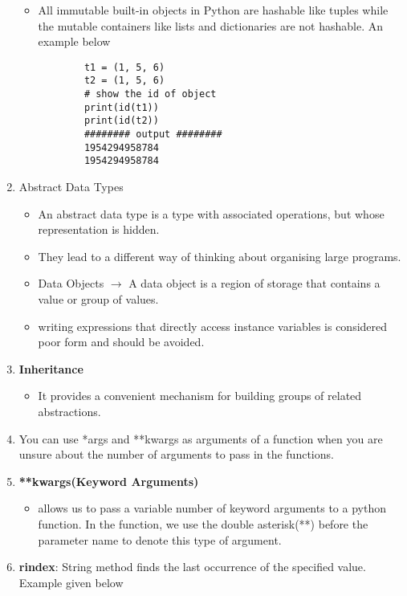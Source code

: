 \documentclass[11pt]{article}
\begin{document}
\begin{enumerate}
\begin{itemize}
            \item All immutable built-in objects in Python are hashable like tuples while the mutable containers like lists and dictionaries are not hashable. An example below
            \begin{verbatim}
        t1 = (1, 5, 6)
        t2 = (1, 5, 6)
        # show the id of object
        print(id(t1))
        print(id(t2))
        ######## output ########
        1954294958784
        1954294958784
            \end{verbatim}
        \end{itemize}
        \item Abstract Data Types
        \begin{itemize}
            \item  An abstract data type is a type with associated operations, but whose representation is hidden.
            \item They lead to a different way of thinking about organising large programs.
            \item Data Objects $\rightarrow$ A data object is a region of storage that contains a value or group of values.
            \item writing expressions that directly access instance variables is considered poor form and should be avoided.
        \end{itemize}
        \item \textbf{Inheritance}
        \begin{itemize}
            \item It provides a convenient mechanism for building groups of related abstractions.
        \end{itemize}
        \item You can use *args and **kwargs as arguments of a function when you are unsure about the number of arguments to pass in the functions.
        \item \textbf{ **kwargs(Keyword Arguments)}
        \begin{itemize}
            \item allows us to pass a variable number of keyword arguments to a python function. In the function, we use the double asterisk(**) before the parameter name to denote this type of argument.
        \end{itemize}
        \item \textbf{rindex}: String method finds the last occurrence of the specified value. Example given below
        \begin{verbatim}

\end{verbatim}
\end{enumerate}
\end{document}

